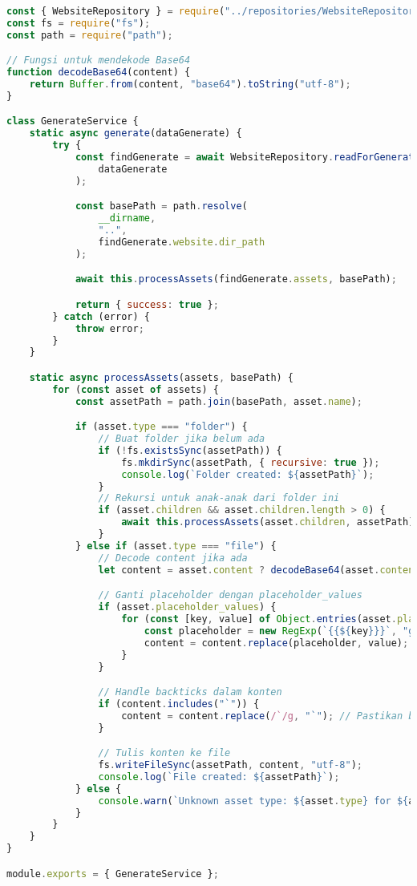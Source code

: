 \begin{lstlisting}[language=Javascript,caption={Generate Website Service}]
const { WebsiteRepository } = require("../repositories/WebsiteRepository");
const fs = require("fs");
const path = require("path");

// Fungsi untuk mendekode Base64
function decodeBase64(content) {
	return Buffer.from(content, "base64").toString("utf-8");
}

class GenerateService {
	static async generate(dataGenerate) {
		try {
			const findGenerate = await WebsiteRepository.readForGenerate(
				dataGenerate
			);

			const basePath = path.resolve(
				__dirname,
				"..",
				findGenerate.website.dir_path
			);

			await this.processAssets(findGenerate.assets, basePath);

			return { success: true };
		} catch (error) {
			throw error;
		}
	}

	static async processAssets(assets, basePath) {
		for (const asset of assets) {
			const assetPath = path.join(basePath, asset.name);

			if (asset.type === "folder") {
				// Buat folder jika belum ada
				if (!fs.existsSync(assetPath)) {
					fs.mkdirSync(assetPath, { recursive: true });
					console.log(`Folder created: ${assetPath}`);
				}
				// Rekursi untuk anak-anak dari folder ini
				if (asset.children && asset.children.length > 0) {
					await this.processAssets(asset.children, assetPath);
				}
			} else if (asset.type === "file") {
				// Decode content jika ada
				let content = asset.content ? decodeBase64(asset.content) : "";

				// Ganti placeholder dengan placeholder_values
				if (asset.placeholder_values) {
					for (const [key, value] of Object.entries(asset.placeholder_values)) {
						const placeholder = new RegExp(`{{${key}}}`, "g");
						content = content.replace(placeholder, value);
					}
				}

				// Handle backticks dalam konten
				if (content.includes("`")) {
					content = content.replace(/`/g, "`"); // Pastikan backticks tetap aman
				}

				// Tulis konten ke file
				fs.writeFileSync(assetPath, content, "utf-8");
				console.log(`File created: ${assetPath}`);
			} else {
				console.warn(`Unknown asset type: ${asset.type} for ${asset.name}`);
			}
		}
	}
}

module.exports = { GenerateService };
\end{lstlisting}